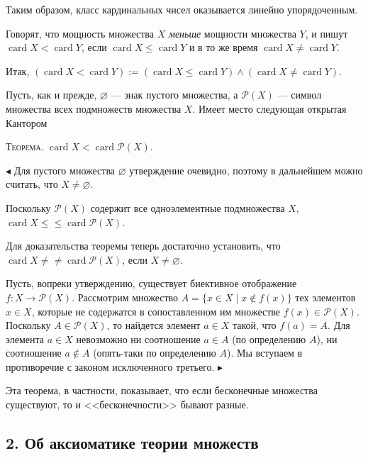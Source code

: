 \medskip

Таким образом, класс кардинальных чисел оказывается линейно упорядоченным.

Говорят, что мощность множества $X$ \textit{меньше} мощности множества $Y$, и
пишут $\operatorname{card} X < \operatorname{card} Y$, если $\operatorname{card} X \leqslant \operatorname{card} Y$ и в то же время $\operatorname{card} X \neq \operatorname{card} Y$.

Итак, $(\operatorname{card} X < \operatorname{card} Y) := (\operatorname{card} X \leqslant \operatorname{card} Y) \land (\operatorname{card} X \neq \operatorname{card} Y)$.

Пусть, как и прежде, $\varnothing$ --- знак пустого множества, а $\mathscr{P}(X)$ --- символ
множества всех подмножеств множества $X$. Имеет место следующая
открытая Кантором

\textsc{Теорема.} \; $\operatorname{card} X < \operatorname{card} \mathscr{P}(X)$.

$\blacktriangleleft$ \; Для пустого множества $\varnothing$ утверждение очевидно, поэтому в дальнейшем можно считать, что $X \neq \varnothing$.

Поскольку $\mathscr{P}(X)$ содержит все одноэлементные подмножества $X$,
$\operatorname{card} X \leqslant {} \leqslant \operatorname{card} \mathscr{P}(X)$.

Для доказательства теоремы теперь достаточно установить, что $\operatorname{card} X \neq {} \neq \operatorname{card} \mathscr{P}(X)$, если $X \neq \varnothing$.

Пусть, вопреки утверждению, существует биективное отображение
$f \colon X \to \mathscr{P}(X)$. Рассмотрим множество $A = \{x \in X \mid x \notin f(x)\}$ тех элементов
$x \in X$, которые не содержатся в сопоставленном им множестве $f(x) \in \mathscr{P}(X)$.
Поскольку $A \in \mathscr{P}(X)$, то найдется элемент $a \in X$ такой, что $f(a) = A$. Для
элемента $a \in X$ невозможно ни соотношение $a \in A$ (по определению $A$),
ни соотношение $a \notin A$ (опять-таки по определению $A$). Мы вступаем в
противоречие с законом исключенного третьего. $\blacktriangleright$

Эта теорема, в частности, показывает, что если бесконечные множества
существуют, то и <<бесконечности>> бывают разные.

\subsection*{2. Об аксиоматике теории множеств}

